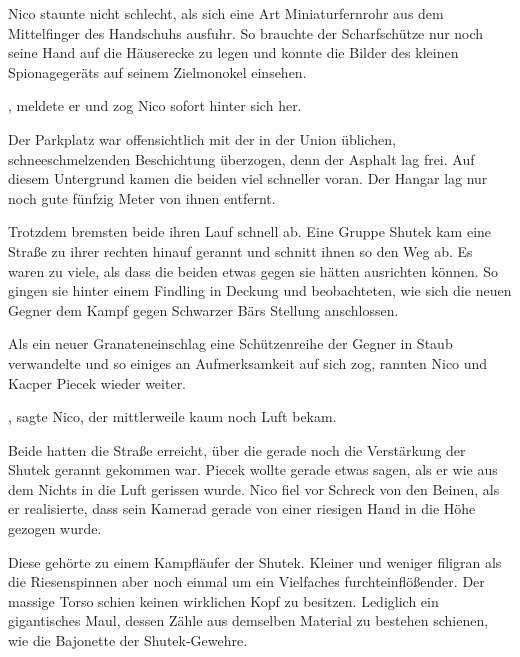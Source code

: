 Nico staunte nicht schlecht, als sich eine Art Miniaturfernrohr aus dem Mittelfinger des Handschuhs ausfuhr. So brauchte der Scharfschütze nur noch seine Hand auf die Häuserecke zu legen und konnte die Bilder des kleinen Spionagegeräts auf seinem Zielmonokel einsehen.

\par

, meldete er und zog Nico sofort hinter sich her.

\par

Der Parkplatz war offensichtlich mit der in der Union üblichen, schneeschmelzenden Beschichtung überzogen, denn der Asphalt lag frei. Auf diesem Untergrund kamen die beiden viel schneller voran. Der Hangar lag nur noch gute fünfzig Meter von ihnen entfernt.

\par

Trotzdem bremsten beide ihren Lauf schnell ab. Eine Gruppe Shutek kam eine Straße zu ihrer rechten hinauf gerannt und schnitt ihnen so den Weg ab. Es waren zu viele, als dass die beiden etwas gegen sie hätten ausrichten können. So gingen sie hinter einem Findling in Deckung und beobachteten, wie sich die neuen Gegner dem Kampf gegen Schwarzer Bärs Stellung anschlossen.

\par

Als ein neuer Granateneinschlag eine Schützenreihe der Gegner in Staub verwandelte und so einiges an Aufmerksamkeit auf sich zog, rannten Nico und Kacper Piecek wieder weiter.

\par

, sagte Nico, der mittlerweile kaum noch Luft bekam.

\par

Beide hatten die Straße erreicht, über die gerade noch die Verstärkung der Shutek gerannt gekommen war. Piecek wollte gerade etwas sagen, als er wie aus dem Nichts in die Luft gerissen wurde. Nico fiel vor Schreck von den Beinen, als er realisierte, dass sein Kamerad gerade von einer riesigen Hand in die Höhe gezogen wurde.

\par

Diese gehörte zu einem Kampfläufer der Shutek. Kleiner und weniger filigran als die Riesenspinnen aber noch einmal um ein Vielfaches furchteinflößender. Der massige Torso schien keinen wirklichen Kopf zu besitzen. Lediglich ein gigantisches Maul, dessen Zähle aus demselben Material zu bestehen schienen, wie die Bajonette der Shutek-Gewehre.


